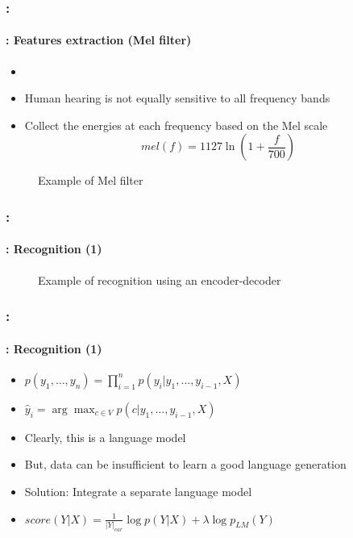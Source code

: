\documentclass[xcolor=table]{beamer}
\begin{document}
\begin{frame}
	\frametitle{\insertshortsubtitle: \insertsection}
	\framesubtitle{\insertsubsection: Features extraction (Mel filter)}
	
	\begin{itemize}
		\item {}
		\item Human hearing is not equally sensitive to all frequency bands
		\item Collect the energies at each frequency based on the Mel scale
		\[mel(f) = 1127 \ln (1 + \frac{f}{700})\]
	\end{itemize}
	\begin{figure}
		\centering
		\caption{Example of Mel filter \cite{2020-jurafsky-martin}}
	\end{figure}

\end{frame}

\begin{frame}
	\frametitle{\insertshortsubtitle: \insertsection}
	\framesubtitle{\insertsubsection: Recognition (1)}
	
	\begin{figure}
		\centering
		\caption{Example of recognition using an encoder-decoder \cite{2020-jurafsky-martin}}
	\end{figure}

\end{frame}

\begin{frame}
	\frametitle{\insertshortsubtitle: \insertsection}
	\framesubtitle{\insertsubsection: Recognition (1)}
	
	\begin{itemize}
		\item $p(y_1, \ldots, y_n) = \prod\limits_{i=1}^n p(y_i| y_1, \ldots, y_{i-1}, X)$
		
		\item $\hat{y}_i = \arg\max_{c \in V} p(c| y_1, \ldots, y_{i-1}, X)$
		
		\item Clearly, this is a language model
		\item But, data can be insufficient to learn a good language generation
		\item Solution: Integrate a separate language model
		
		\item $score(Y|X) = \frac{1}{|Y|_{car}} \log p(Y|X) + \lambda \log p_{LM}(Y)$
	\end{itemize}

\end{frame}
\end{document}
